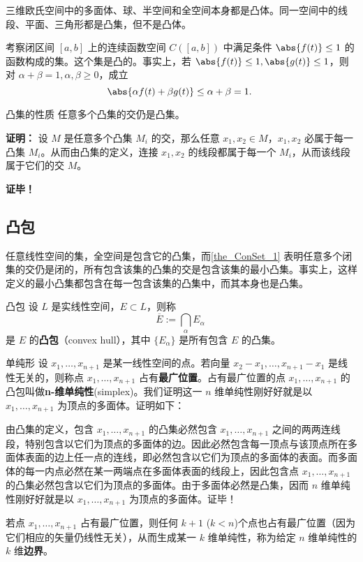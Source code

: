 \begin{example}{}
三维欧氏空间中的多面体、球、半空间和全空间本身都是凸体。同一空间中的线段、平面、三角形都是凸集，但不是凸体。
\end{example}

\begin{example}{}
考察闭区间 $[a,b]$ 上的连续函数空间 $C([a,b])$ 中满足条件 $\abs{f(t)}\leq1$ 的函数构成的集。这个集是凸的。事实上，若 $\abs{f(t)}\leq1,\abs{g(t)}\leq1$，则对 $\alpha+\beta=1,\alpha,\beta\geq0$，成立
\begin{equation}
\abs{\alpha f(t)+\beta g(t)}\leq\alpha+\beta=1.~
\end{equation}

\end{example}




\begin{theorem}{凸集的性质}\label{the_ConSet_1}
任意多个凸集的交仍是凸集。
\end{theorem}
\textbf{证明：} 设 $M$ 是任意多个凸集 $M_i$ 的交，那么任意 $x_1,x_2\in M$，$x_1,x_2$ 必属于每一凸集 $M_i$。从而由凸集的定义，连接 $x_1,x_2$ 的线段都属于每一个 $M_i$，从而该线段属于它们的交 $M$。

\textbf{证毕！} 

\subsection{凸包}
任意线性空间的集，全空间是包含它的凸集，而\autoref{the_ConSet_1} 表明任意多个闭集的交仍是闭的，所有包含该集的凸集的交是包含该集的最小凸集。事实上，这样定义的最小凸集都包含在每一包含该集的凸集中，而其本身也是凸集。
\begin{definition}{凸包}
设 $L$ 是实线性空间，$E\subset L$，则称
\begin{equation}
\overline{E}:=\bigcap_{\alpha}E_\alpha~
\end{equation}
是 $E$ 的\textbf{凸包}（convex hull），其中 $\{E_\alpha\}$ 是所有包含 $E$ 的凸集。
\end{definition}

\begin{example}{单纯形}
设 $x_1,\ldots,x_{n+1}$ 是某一线性空间的点。若向量 $x_2-x_1,\ldots,x_{n+1}-x_1$ 是线性无关的，则称点 $x_1,\ldots,x_{n+1}$ 占有\textbf{最广位置}。占有最广位置的点 $x_1,\ldots,x_{n+1}$ 的凸包叫做\textbf{n-维单纯性}(simplex)。我们证明这一 $n$ 维单纯性刚好好就是以 $x_1,\ldots,x_{n+1}$ 为顶点的多面体。证明如下：

由凸集的定义，包含 $x_1,\ldots,x_{n+1}$ 的凸集必然包含 $x_1,\ldots,x_{n+1}$ 之间的两两连线段，特别包含以它们为顶点的多面体的边。因此必然包含每一顶点与该顶点所在多面体表面的边上任一点的连线，即必然包含以它们为顶点的多面体的表面。而多面体的每一内点必然在某一两端点在多面体表面的线段上，因此包含点 $x_1,\ldots,x_{n+1}$ 的凸集必然包含以它们为顶点的多面体。由于多面体必然是凸集，因而
 $n$ 维单纯性刚好好就是以 $x_1,\ldots,x_{n+1}$ 为顶点的多面体。证毕！

若点 $x_1,\ldots,x_{n+1}$ 占有最广位置，则任何 $k+1$ ($k<n$)个点也占有最广位置（因为它们相应的矢量仍线性无关），从而生成某一 $k$ 维单纯性，称为给定 $n$ 维单纯性的 $k$ 维\textbf{边界}。
\end{example}

